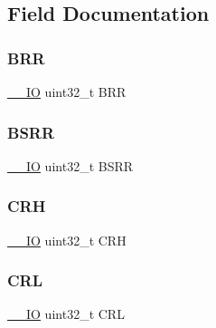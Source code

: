 \subsection{Field Documentation}
\mbox{\label{struct_g_p_i_o___type_def_a092e59d908b2ca112e31047e942340cb}} 
\subsubsection{\texorpdfstring{BRR}{BRR}}
{\footnotesize\ttfamily \mbox{\hyperlink{core__sc300_8h_aec43007d9998a0a0e01faede4133d6be}{\+\_\+\+\_\+\+IO}} uint32\+\_\+t B\+RR}

\mbox{\label{struct_g_p_i_o___type_def_ac25dd6b9e3d55e17589195b461c5ec80}} 
\subsubsection{\texorpdfstring{BSRR}{BSRR}}
{\footnotesize\ttfamily \mbox{\hyperlink{core__sc300_8h_aec43007d9998a0a0e01faede4133d6be}{\+\_\+\+\_\+\+IO}} uint32\+\_\+t B\+S\+RR}

\mbox{\label{struct_g_p_i_o___type_def_acc2f82d559cfd955b5a68c1b54c5fc35}} 
\subsubsection{\texorpdfstring{CRH}{CRH}}
{\footnotesize\ttfamily \mbox{\hyperlink{core__sc300_8h_aec43007d9998a0a0e01faede4133d6be}{\+\_\+\+\_\+\+IO}} uint32\+\_\+t C\+RH}

\mbox{\label{struct_g_p_i_o___type_def_ae3e1b95965ce8c9f06490047cb9967a9}} 
\subsubsection{\texorpdfstring{CRL}{CRL}}
{\footnotesize\ttfamily \mbox{\hyperlink{core__sc300_8h_aec43007d9998a0a0e01faede4133d6be}{\+\_\+\+\_\+\+IO}} uint32\+\_\+t C\+RL}

